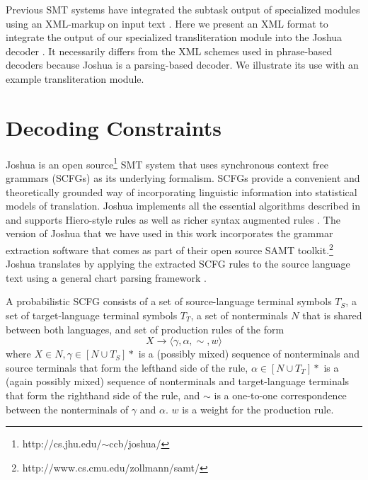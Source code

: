 \documentclass[logo]{pbml}
\begin{document}
Previous SMT systems have integrated the subtask output of specialized modules using an XML-markup on input text \cite{Koehn2004b, Senellart2003}. Here we present an XML format to integrate the output of our specialized transliteration module into the Joshua decoder \cite{JoshuaWMT}. It necessarily differs from the XML schemes used in phrase-based decoders because Joshua is a parsing-based decoder. We illustrate its use with an example transliteration module.

\section{Decoding Constraints}
Joshua \cite{JoshuaWMT} is an open source\footnote{http://cs.jhu.edu/$\sim$ccb/joshua/} SMT system that uses synchronous context free grammars (SCFGs) as its underlying formalism. SCFGs provide a convenient and theoretically grounded way of incorporating linguistic information into statistical models of translation. Joshua implements all the essential algorithms described in \cite{Chiang2007} and supports Hiero-style rules \cite{Chiang2005} as well as richer syntax augmented rules \cite{Zollman2008}. The version of Joshua that we have used in this work incorporates the grammar extraction software that comes as part of their open source SAMT toolkit.\footnote{http://www.cs.cmu.edu/zollmann/samt/} Joshua translates by applying the extracted SCFG rules to the source language text using a general chart parsing framework \cite{PBML09}.

A probabilistic SCFG consists of a set of source-language terminal symbols $T_S$, a set of target-language terminal symbols $T_T$, a set of nonterminals $N$ that is shared between both languages, and set of production rules of the form
$$X \to \langle \gamma,\alpha,\sim,w \rangle$$
where $X \in N, \gamma \in [N \cup T_S]*$ is a (possibly mixed) sequence of nonterminals and source terminals that form the lefthand side of the rule, $\alpha \in [N \cup T_T]*$ is a  (again possibly mixed) sequence of nonterminals and target-language terminals that form the righthand side of the rule, and $\sim$ is a one-to-one correspondence between the nonterminals of $\gamma$ and $\alpha$. $w$ is a weight for the production rule.
\end{document}
